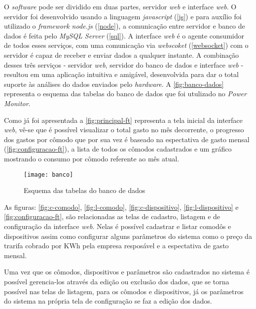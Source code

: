 O \textit{software} pode ser dividido em duas partes, servidor \textit{web} e interface \textit{web}. O servidor foi desenvolvido usando a linguagem
\textit{javascript} (\autoref{js}) e para auxílio foi utilizado o \textit{framework node.js} (\autoref{node}), a comunicação entre servidor e banco de dados
é feita pelo \textit{MySQL Server} (\autoref{sql}). A interface \textit{web} é o agente consumidor de todos esses serviços, com uma comunicação via 
\textit{webscoket} (\autoref{websocket}) com o servidor é capaz de receber e enviar dados a qualquer instante. A combinação desses três serviços - servidor \textit{web},
servidor do banco de dados e interface \textit{web} - resultou em uma aplicação intuitiva e amigável, desenvolvida para dar o total suporte às análises do dados
enviados pelo \textit{hardware}. A \autoref{fig:banco-dados} representa o esquema das tabelas do banco de dados que foi utulizado no \textit{Power Monitor}.

Como já foi apresentada a \autoref{fig:principal-ft} representa a tela inicial da interface \textit{web}, vê-se que é possível
visualizar o total gasto no mês decorrente, o progresso dos gastos por cômodo que por sua vez é baseado na espectativa de gasto mensal (\autoref{fig:configuracao-ft}), a lista
de todos os cômodos cadastrados e um gráfico mostrando o consumo por cômodo referente ao mês atual.

\begin{figure}[h!]
	\texttt{[image: banco]}
	\centering
	\caption[Esquema das tabelas do banco de dados]{Esquema das tabelas do banco de dados}
	\label{fig:banco-dados}
\end{figure}
\FloatBarrier

As figuras: \ref{fig:c-comodo}, \ref{fig:l-comodo}, \ref{fig:c-dispositivo}, \ref{fig:l-dispositivo} e \ref{fig:configuracao-ft}, 
são relacionadas as telas de cadastro, listagem e de configuração da interface \textit{web}. Nelas é possível cadastrar e listar comodôs e dispositivos assim como 
configurar alguns parâmetros do sistema como o preço da trarifa cobrado por KWh pela empresa resposável e a espectativa de gasto mensal.

Uma vez que os cômodos, dispositivos e parâmetros são cadastrados no sistema é possível gerencia-los através da edição ou exclusão dos dados, que se torna possível
nas telas de listagem, para os cômodos e dispositivos, já os parâmetros do sistema na própria tela de configuração se faz a edição dos dados. 

